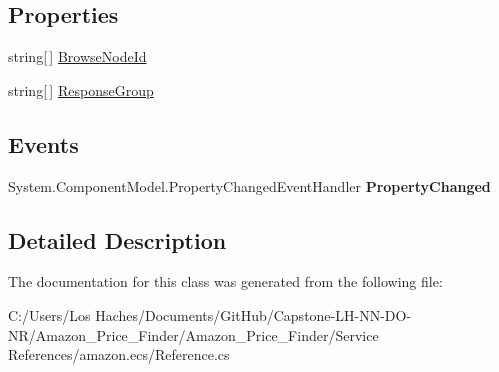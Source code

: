 \subsection*{Properties}
\begin{DoxyCompactItemize}
\item 
\hypertarget{class_amazon___price___finder_1_1amazon_1_1ecs_1_1_browse_node_lookup_request_afdcf461893272ee3842436f0bfcbae66}{string\mbox{[}$\,$\mbox{]} \hyperlink{class_amazon___price___finder_1_1amazon_1_1ecs_1_1_browse_node_lookup_request_afdcf461893272ee3842436f0bfcbae66}{Browse\-Node\-Id}}\label{class_amazon___price___finder_1_1amazon_1_1ecs_1_1_browse_node_lookup_request_afdcf461893272ee3842436f0bfcbae66}

\begin{DoxyCompactList}\small\item\em \end{DoxyCompactList}\item 
\hypertarget{class_amazon___price___finder_1_1amazon_1_1ecs_1_1_browse_node_lookup_request_ae499823441c898547568293ee87e98b8}{string\mbox{[}$\,$\mbox{]} \hyperlink{class_amazon___price___finder_1_1amazon_1_1ecs_1_1_browse_node_lookup_request_ae499823441c898547568293ee87e98b8}{Response\-Group}}\label{class_amazon___price___finder_1_1amazon_1_1ecs_1_1_browse_node_lookup_request_ae499823441c898547568293ee87e98b8}

\begin{DoxyCompactList}\small\item\em \end{DoxyCompactList}\end{DoxyCompactItemize}
\subsection*{Events}
\begin{DoxyCompactItemize}
\item 
\hypertarget{class_amazon___price___finder_1_1amazon_1_1ecs_1_1_browse_node_lookup_request_a55a77d9e0b1f3b3e1c3e5e845392e7c1}{System.\-Component\-Model.\-Property\-Changed\-Event\-Handler {\bfseries Property\-Changed}}\label{class_amazon___price___finder_1_1amazon_1_1ecs_1_1_browse_node_lookup_request_a55a77d9e0b1f3b3e1c3e5e845392e7c1}

\end{DoxyCompactItemize}


\subsection{Detailed Description}


The documentation for this class was generated from the following file\-:\begin{DoxyCompactItemize}
\item 
C\-:/\-Users/\-Los Haches/\-Documents/\-Git\-Hub/\-Capstone-\/\-L\-H-\/\-N\-N-\/\-D\-O-\/\-N\-R/\-Amazon\-\_\-\-Price\-\_\-\-Finder/\-Amazon\-\_\-\-Price\-\_\-\-Finder/\-Service References/amazon.\-ecs/Reference.\-cs\end{DoxyCompactItemize}
